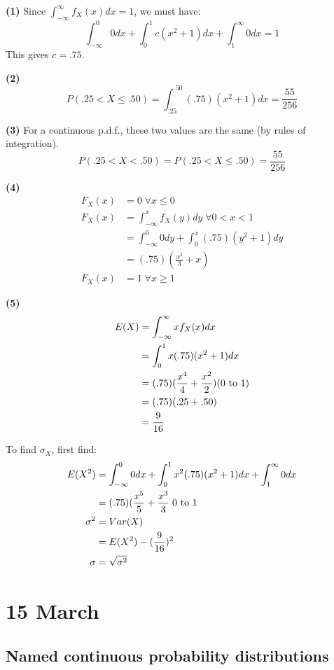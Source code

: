 \documentclass[12pt]{article}
\begin{document}
\textbf{(1)} Since $\int_{-\infty}^{\infty} f_X (x) dx = 1$, we must have:
\[
    \int_{-\infty}^{0} 0 dx + \int_{0}^{1} c(x^2 + 1) dx + \int_{1}^{\infty} 0 dx = 1
\]
This gives $c=.75$.

\textbf{(2)}
\[
    P(.25 < X \leq .50) = \int_{.25}^{.50} (.75)(x^2 + 1) dx = \frac{55}{256}
\]

\textbf{(3)} For a continuous p.d.f., these two values are the same (by rules of integration).
\[
    P(.25 < X < .50) = P(.25 < X \leq .50) = \frac{55}{256}
\]

\textbf{(4)}
\begin{align*}
    F_X (x) &= 0 \; \forall x \leq 0 \\
    F_X (x) &= \int_{-\infty}^{x} f_X (y) dy \; \forall 0 < x < 1 \\
        &= \int_{-\infty}^{0} 0 dy + \int_{0}^{x} (.75)(y^2 + 1) dy \\
        &= (.75)(\frac{x^3}{3} + x) \\
    F_X (x) &= 1 \; \forall x \geq 1
\end{align*}

\textbf{(5)}
\begin{align*}
    E(X) &= \int_{-\infty}^{\infty} x f_X (x) dx \\
        &= \int_{0}^{1} x (.75) (x^2 + 1) dx \\
        &= (.75) (\frac{x^4}{4} + \frac{x^2}{2}) \textnormal{(0 to 1)} \\
        &= (.75)(.25 + .50) \\
        &= \frac{9}{16}
\end{align*}

To find $\sigma_X$, first find:
\begin{align*}
    E(X^2) &= \int_{-\infty}^{0} 0 dx + \int_0^1 x^2 (.75) (x^2 + 1) dx + \int_1^{\infty} 0 dx \\
        &= (.75)(\frac{x^5}{5} + \frac{x^3}{3} \; \textnormal{0 to 1} \\
    \sigma^2 &= Var(X) \\
        &= E(X^2) - (\frac{9}{16})^2 \\
    \sigma &= \sqrt{\sigma^2}
\end{align*}

\section{15 March}
\subsection{Named continuous probability distributions}
\end{document}
